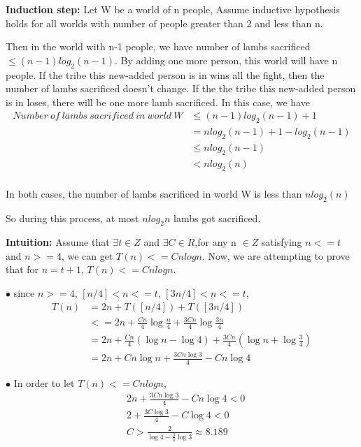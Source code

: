 \documentclass[12pt,a4paper]{article}
\newcommand{\question}[1]{\bigskip\noindent{\textbf{Q{#1} solution}}}
\begin{document}
\textbf{Induction step:} Let W be a world of n people, Assume inductive hypothesis holds for all worlds with number of people greater than 2 and less than n.

Then in the world with n-1 people, we have number of lambs sacrificed $\le (n-1)log_2(n-1)$. By adding one more person, this world will have n people. If the tribe this new-added person is in wins all the fight, then the number of lambs sacrificed doesn't change. If the the tribe this new-added person is in loses, there will be one more lamb sacrificed. In this case, we have
\begin{equation*}
    \begin{split}
        Number\ of\ lambs\ sacrificed\ in\ world\ W & \le (n-1)log_2(n-1) + 1 \\
             & = nlog_2(n-1) + 1 - log_2(n-1) \\
             & \le nlog_2(n-1) \\
             & < nlog_2(n) \\
    \end{split}
\end{equation*}

In both cases, the number of lambs sacrificed in world W is less than $nlog_2(n)$

So during this process, at most $nlog_2n$ lambs got sacrificed.

\question{3.A}

\noindent %
	\textbf{Intuition:}
	{Assume that $\exists t \in Z$ and $\exists C \in R$,for any n $\in Z$ satisfying $n<=t$ and $n>=4$, we can get $T(n)<=Cnlogn$. Now, we are attempting to prove that for $n=t+1$, $T(n)<=Cnlogn$.}%

		$\bullet$ since $n>=4$, $[n/4]<n<=t$, $[3n/4]<n<=t$,
		\begin{align*}
 		T(n)&=2n+T([n/4])+T([3n/4]) \\
		&<=2n + \frac{Cn}{4} \log{\frac{n}{4}} + \frac{3Cn}{4} \log{ \frac{3n}{4}}\\
		&= 2n + \frac{Cn}{4}(\log{n}-\log{4}) + \frac{3Cn}{4} ({ \log{n}+\log{\frac{3}{4}}})\\
		&= 2n + Cn\log{n} + \frac{3Cn\log{3}}{4} - Cn\log{4}
		\end{align*}
		
		$\bullet$ In order to let $T(n)<=Cnlogn$,
		\begin{align*}
 		&2n + \frac{3Cn\log{3}}{4} - Cn\log{4} <0 \\
		&2 + \frac{3C\log{3}}{4} - C\log{4} <0 \\
		&C > \frac{2}{\log{4}-\frac{3}{4}\log{3}}\approx 8.189
		\end{align*}
		
\end{document}
